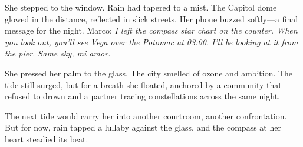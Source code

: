 She stepped to the window. Rain had tapered to a mist. The Capitol dome glowed in the distance, reflected in slick streets. Her phone buzzed softly—a final message for the night. Marco: \textit{I left the compass star chart on the counter. When you look out, you'll see Vega over the Potomac at 03:00. I'll be looking at it from the pier. Same sky, mi amor.}

She pressed her palm to the glass. The city smelled of ozone and ambition. The tide still surged, but for a breath she floated, anchored by a community that refused to drown and a partner tracing constellations across the same night.

The next tide would carry her into another courtroom, another confrontation. But for now, rain tapped a lullaby against the glass, and the compass at her heart steadied its beat.
